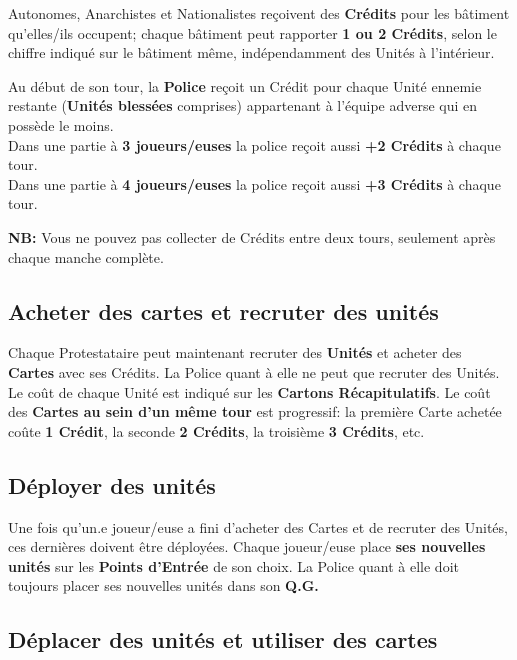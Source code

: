 \documentclass[a4paper,13pt]{scrartcl}
\begin{document}
Autonomes, Anarchistes et Nationalistes reçoivent des \textbf{Crédits} pour les bâtiment qu'elles/ils occupent; chaque bâtiment peut rapporter \textbf{1 ou 2 Crédits}, selon le chiffre indiqué sur le bâtiment même, indépendamment des Unités à l'intérieur.

Au début de son tour, la \textbf{Police} reçoit un Crédit pour chaque Unité ennemie restante (\textbf{Unités blessées} comprises) appartenant à l'équipe adverse qui en possède le moins.\\
Dans une partie à \textbf{3 joueurs/euses} la police reçoit aussi \textbf{+2 Crédits} à chaque tour.\\
Dans une partie à \textbf{4 joueurs/euses} la police reçoit aussi \textbf{+3 Crédits} à chaque tour.

\textbf{NB:} Vous ne pouvez pas collecter de Crédits entre deux tours, seulement après chaque manche complète.

\subsection{Acheter des cartes et recruter des unités}
Chaque Protestataire peut maintenant recruter des \textbf{Unités} et acheter des \textbf{Cartes} avec ses Crédits. La Police quant à elle ne peut que recruter des Unités.
Le coût de chaque Unité est indiqué sur les \textbf{Cartons Récapitulatifs}.
Le coût des \textbf{Cartes au sein d'un même tour} est progressif: la première Carte achetée coûte \textbf{1 Crédit}, la seconde \textbf{2 Crédits}, la troisième \textbf{3 Crédits}, etc.

\subsection{Déployer des unités}
Une fois qu'un.e joueur/euse a fini d'acheter des Cartes et de recruter des Unités, ces dernières doivent être déployées. Chaque joueur/euse place \textbf{ses nouvelles unités} sur les \textbf{Points d'Entrée} de son choix. La Police quant à elle doit toujours placer ses nouvelles unités dans son \textbf{Q.G.}

\subsection{Déplacer des unités et utiliser des cartes}
\end{document}
